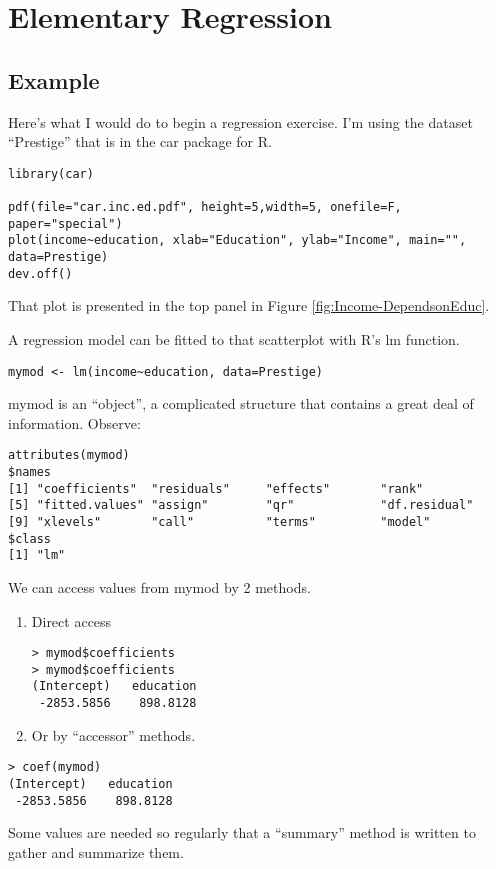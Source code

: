 
\chapter{Elementary Regression}

\section{Example}

Here's what I would do to begin a regression exercise. I'm using the
dataset ``Prestige'' that is in the car package for R.

\begin{lstlisting}[breaklines=true]
library(car)

pdf(file="car.inc.ed.pdf", height=5,width=5, onefile=F, paper="special")
plot(income~education, xlab="Education", ylab="Income", main="", data=Prestige)
dev.off()
\end{lstlisting}
That plot is presented in the top panel in Figure \ref{fig:Income-DependsonEduc}. 

A regression model \citet{gelman_bayesian_2003}can be fitted to that
scatterplot with R's lm function.

\begin{lstlisting}
mymod <- lm(income~education, data=Prestige)
\end{lstlisting}
mymod is an ``object'', a complicated structure that contains a
great deal of information. Observe:

\begin{lstlisting}
attributes(mymod)
$names  
[1] "coefficients"  "residuals"     "effects"       "rank"           
[5] "fitted.values" "assign"        "qr"            "df.residual"    
[9] "xlevels"       "call"          "terms"         "model"        
$class 
[1] "lm" 
\end{lstlisting}
We can access values from mymod by 2 methods. 
\begin{enumerate}
\item Direct access 

\begin{lstlisting}
> mymod$coefficients
> mymod$coefficients
(Intercept)   education 
 -2853.5856    898.8128 
\end{lstlisting}
\item Or by ``accessor'' methods.
\end{enumerate}
\begin{lstlisting}
> coef(mymod)
(Intercept)   education 
 -2853.5856    898.8128 
\end{lstlisting}
Some values are needed so regularly that a ``summary'' method is
written to gather and summarize them.

